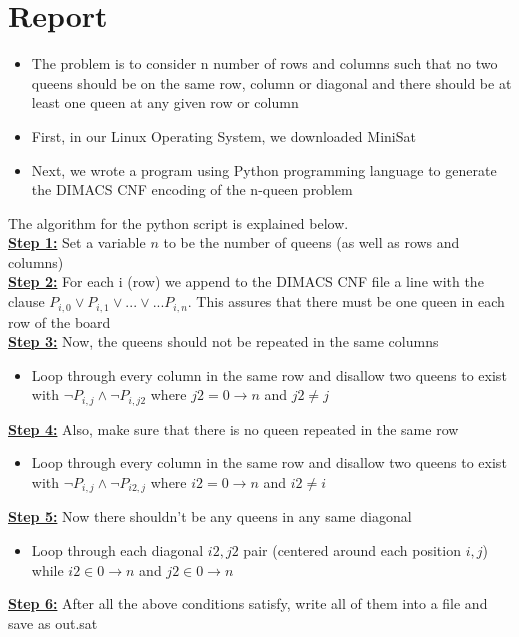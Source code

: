 \documentclass[12pt, letterpaper]{article}
\begin{document}
\section*{Report}
\begin{itemize}
    \item The problem is to consider n number of rows and columns such that no two queens should be on the same row, column or diagonal and there should be at least one queen at any given row or column
    \item First, in our Linux Operating System, we downloaded MiniSat
    \item Next, we wrote a program using Python programming language to generate the DIMACS CNF encoding of the n-queen problem
\end{itemize}
The algorithm for the python script is explained below.\\
\textbf{\underline{Step 1:}} Set a variable $n$ to be the number of queens (as well as rows and columns) \\
\textbf{\underline{Step 2:}} For each i (row) we append to the DIMACS CNF file a line with the clause $P_{i,0} \vee{} P_{i,1} \vee{} ... \vee ... P_{i,n} $. This assures that there must be one queen in each row of the board\\
\textbf{\underline{Step 3:}}
Now, the queens should not be repeated in the same columns
\begin{itemize}
    \item	Loop through every column in the same row and disallow two queens to exist with $\lnot{} P_{i,j} \wedge{} \lnot{} P_{i,j2}$ where $j2 = 0 \rightarrow{} n$ and $j2 \neq{} j$
\end{itemize}
\textbf{\underline{Step 4:}}
Also, make sure that there is no queen repeated in the same row
\begin{itemize}
    \item	Loop through every column in the same row and disallow two queens to exist with $\lnot{} P_{i,j} \wedge{} \lnot{} P_{i2,j}$ where $i2 = 0 \rightarrow{} n$ and $i2 \neq{} i$
\end{itemize}
\textbf{\underline{Step 5:}}
Now there shouldn't be any queens in any same diagonal
\begin{itemize}
    \item Loop through each diagonal $i2,j2$ pair (centered around each position $i,j$) while $i2 \in{} 0 \rightarrow{} n$ and $j2 \in{} 0 \rightarrow{} n$
\end{itemize}
\textbf{\underline{Step 6:}}
After all the above conditions satisfy, write all of them into a file and save as out.sat
\end{document}
